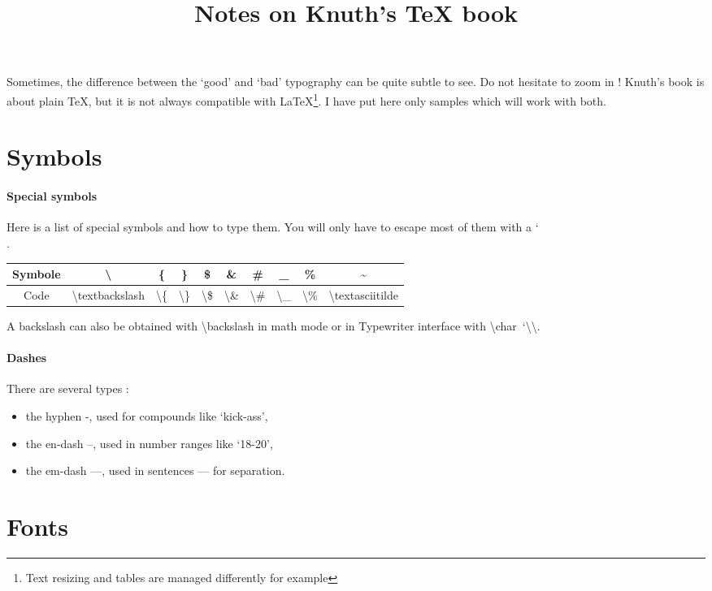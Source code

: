 \documentclass{article}
\newcommand\bSLASH{\char`\\}
\newcommand\BSLASH{\textbackslash}
\begin{document}
\title{Notes on Knuth's \TeX{} book}
\date{}
\maketitle

\danger Sometimes, the difference between the `good' and `bad' typography
can be quite subtle to see. Do not hesitate to zoom in !
\danger Knuth's book is about plain \TeX, but it is not always compatible 
with  \LaTeX\footnote{Text resizing and tables are managed differently for 
example}. I have put here only samples which will work with both. 

\section{Symbols}
\paragraph{Special symbols}
Here is a list of special symbols and how to type them. You will only have to
escape most of them with a \bSLASH.
\begin{center}
\begin{tabular}{c|c c c c c c c c c} 
Symbole & \BSLASH  & \{ & \} & \$ & \& & \# & \_ & \% & \textasciitilde \\
\hline
Code   & \BSLASH textbackslash&\BSLASH\{ &\BSLASH\} &
\BSLASH\$ & \BSLASH\& & \BSLASH\#  & \BSLASH\_  & 
\BSLASH\% & \BSLASH textasciitilde \\
\end{tabular}
\end{center}

A backslash can also be obtained with \BSLASH backslash in math mode or
in Typewriter interface with \BSLASH char~`\BSLASH\BSLASH.
\paragraph{Dashes}
There are several types :
\begin{itemize}
\item the hyphen -, used for compounds like `kick-ass',
\item the en-dash --, used in number ranges like `18-20',
\item the em-dash ---, used in sentences --- for separation.
\end{itemize}

\section{Fonts}
\end{document}
